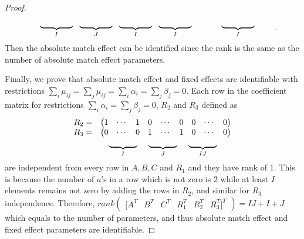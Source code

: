 \documentclass[12pt]{article}
\begin{document}
\begin{proof}
\begin{equation*}
\begin{array}{rccccccccccccccccll}
              &\multicolumn{16}{l}{\underbrace{\hspace{4em}}_{I}\ \ \underbrace{\hspace{4em}}_{J}\ \ \underbrace{\hspace{4em}}_{I}\ \ \underbrace{\hspace{4em}}_{I}\hspace{3.5em} \underbrace{\hspace{4em}}_{I}} &&
        \end{array}.
    \end{equation*}
    Then the absolute match effect can be identified since the rank is the same as the number of absolute match effect parameters.

    Finally, we prove that absolute match effect and fixed effects are identifiable with restrictions $\sum_i \mu_{i j}=\sum_j \mu_{i j}=\sum_i \alpha_i=\sum_j \beta_j=0$.
    Each row in the coefficient matrix for restrictions $\sum_i \alpha_i=\sum_j \beta_j=0$, $R_2$ and $R_3$ defined as
    \begin{equation*}
        \begin{array}{cc}
             R_2=& \begin{pmatrix}
                 1 & \cdots & 1 & 0 & \cdots & 0 & 0 & \cdots & 0
             \end{pmatrix}\\
             R_3=& \begin{pmatrix}
                 0 & \cdots & 0 & 1 & \cdots & 1 & 0 & \cdots & 0
             \end{pmatrix} \\
             & \multicolumn{1}{l}{\hspace{1em}\underbrace{\hspace{3.5em}}_{I}\hspace{1.2em}\underbrace{\hspace{3.5em}}_{J}\hspace{1.2em}\underbrace{\hspace{3.5em}}_{IJ}} 
        \end{array}
    \end{equation*}
    are independent from every row in $A,B,C$ and $R_1$ and they have rank of $1$. 
    This is because the number of $a$'s in a row which is not zero is 2 while at least $I$ elements remains not zero by adding the rows in $R_2$, and similar for $R_3$ independence.
    Therefore, $rank\begin{pmatrix}
        [A^T & B^T & C^T & R_1^T & R_2^T & R_3^T]^T
    \end{pmatrix}=IJ+I+J$ which equals to the number of parameters, and thus absolute match effect and fixed effect parameters are identifiable.
\end{proof}
\end{document}
